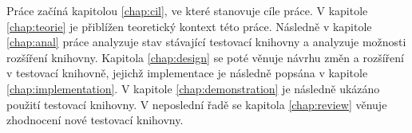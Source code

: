\begin{introduction}
Práce začíná kapitolou \ref{chap:cil}, ve které stanovuje cíle práce. V kapitole \ref{chap:teorie} je přiblížen teoretický kontext této práce. Následně v kapitole \ref{chap:anal} práce analyzuje stav stávající testovací knihovny a analyzuje možnosti rozšíření knihovny. Kapitola \ref{chap:design} se poté věnuje návrhu změn a rozšíření v testovací knihovně, jejichž implementace je následně popsána v kapitole \ref{chap:implementation}. V kapitole \ref{chap:demonstration} je následně ukázáno použití testovací knihovny. V neposlední řadě se kapitola \ref{chap:review} věnuje zhodnocení nové testovací knihovny. 
 
\end{introduction}
